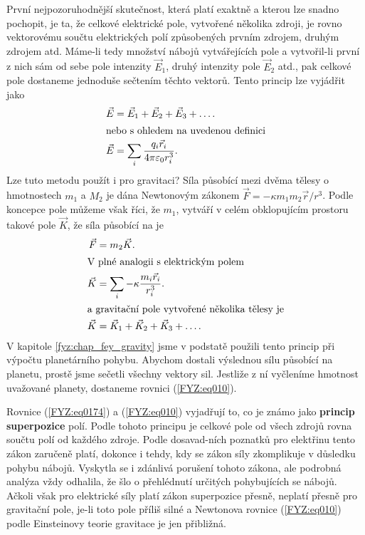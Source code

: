 {    První nejpozoruhodnější skutečnost, která platí exaktně a kterou lze snadno pochopit, je ta, že 
    celkové elektrické pole, vytvořené několika zdroji, je rovno vektorovému součtu elektrických 
    polí způsobených prvním zdrojem, druhým zdrojem atd. Máme-li tedy množství nábojů vytvářejících 
    pole a vytvořil-li první z nich sám od sebe pole intenzity \(\vec{E}_1\), druhý intenzity pole 
    \(\vec{E}_2\) atd., pak celkové pole dostaneme jednoduše sečtením těchto vektorů. Tento princip 
    lze vyjádřit jako
    \begin{align}
      \vec{E} &= \vec{E}_1 + \vec{E}_2 + \vec{E}_3 + \ldots.                  \label{FYZ:eq0174} \\
      \shortintertext{nebo s ohledem na uvedenou definici}
      \vec{E} &= \sum_i\frac{q_i\vec{r}_i}{4\pi\varepsilon_0r_i^3}.           \label{FYZ:eq0175}
    \end{align}
    Lze tuto metodu použít i pro gravitaci? Síla působící mezi dvěma tělesy o hmotnostech \(m_1\) a 
    \(M_2\) je dána Newtonovým zákonem \(\vec{F} = -\kappa m_1m_2\vec{r}/r^3\). Podle koncepce pole 
    můžeme však říci, že \(m_1\), vytváří v celém obklopujícím prostoru takové pole \(\vec{K}\), že 
    síla působící na je
    \begin{align}
      \vec{F} &= m_2\vec{K}.                                                \label{FYZ:eq0176}  \\
      \shortintertext{V plné analogii s elektrickým polem}
      \vec{K} &= \sum_i-\kappa\frac{m_i\vec{r}_i}{r_i^3}.                   \label{FYZ:eq0177}  \\
      \shortintertext{a gravitační pole vytvořené několika tělesy je}
      \vec{K} &= \vec{K}_1 + \vec{K}_2 + \vec{K}_3 + \ldots.                \label{FYZ:eq010}
    \end{align}
    V kapitole \ref{fyz:chap_fey_gravity} jsme v podstatě použili tento princip při výpočtu 
    planetárního pohybu. Abychom dostali výslednou sílu působící na planetu, prostě jsme sečetli 
    všechny vektory sil. Jestliže z ní vyčleníme hmotnost uvažované planety, dostaneme rovnici 
    (\ref{FYZ:eq010}).
    
    Rovnice (\ref{FYZ:eq0174}) a (\ref{FYZ:eq010}) vyjadřují to, co je známo jako \textbf{princip 
    superpozice} polí. Podle tohoto principu je celkové pole od všech zdrojů rovna součtu polí od 
    každého zdroje. Podle dosavad-ních poznatků pro elektřinu tento zákon zaručeně platí, dokonce i 
    tehdy, kdy se zákon síly zkomplikuje v důsledku pohybu nábojů. Vyskytla se i zdánlivá porušení 
    tohoto zákona, ale podrobná analýza vždy odhalila, že šlo o přehlédnutí určitých pohybujících 
    se nábojů. Ačkoli však pro elektrické síly platí zákon superpozice přesně, neplatí přesně pro 
    gravitační pole, je-li toto pole příliš silné a Newtonova rovnice (\ref{FYZ:eq010}) podle 
    Einsteinovy teorie gravitace je jen přibližná.
    
}
